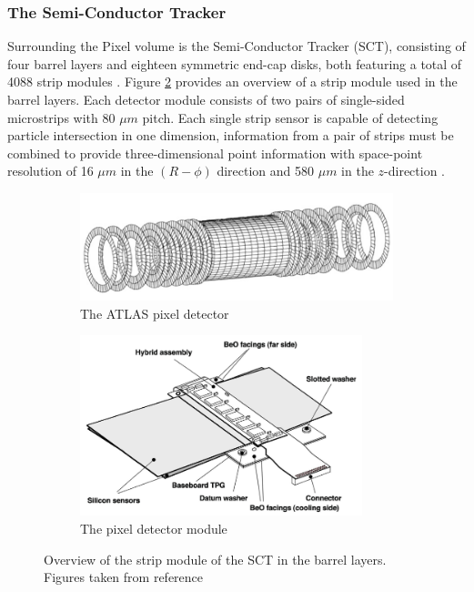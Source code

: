 \subsubsection{The Semi-Conductor Tracker}

Surrounding the Pixel volume is the Semi-Conductor Tracker (SCT), consisting of four barrel layers and eighteen symmetric end-cap disks, both featuring a total of 4088 strip modules \cite{ATLAS-TDR-04, ATLAS-TDR-05}. Figure \ref{subfig:strip-module} provides an overview of a strip module used in the barrel layers. Each detector module consists of two pairs of single-sided microstrips with $80$ $\mu m$ pitch. Each single strip sensor is capable of detecting particle intersection in one dimension, information from a pair of strips must be combined to provide three-dimensional point information with space-point resolution of 16 $\mu m$ in the $(R-\phi)$ direction and 580 $\mu m$ in the $z$-direction \cite{BARONE201357}. 

\begin{figure}[h!]
     \centering
     \begin{subfigure}{0.7\textwidth}
         \centering
         \includegraphics[width=\textwidth]{figures/sct-detector.png}
         \caption{The ATLAS pixel detector}
         \label{subfig:sct-detector}
     \end{subfigure}
     \begin{subfigure}{0.65\textwidth}
         \centering
         \includegraphics[width=0.9\textwidth]{figures/strip-module.png}
         \caption{The pixel detector module}
         \label{subfig:strip-module}
     \end{subfigure}
    \caption{Overview of the strip module of the SCT in the barrel layers. Figures taken from reference~\cite{Robinson_2013}}
    \label{fig:sct-detector}
\end{figure}

